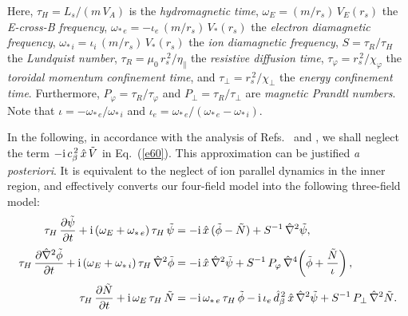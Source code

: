\documentclass[12pt,prb,aps,notitlepage]{revtex4-1}
\begin{document}
Here, 
$\tau_H = L_s/(m\,V_A)$ 
is the  {\em hydromagnetic time}, 
$\omega_E =(m/r_s)\,V_E(r_s)$
  the 
 {\em E-cross-B frequency}, 
$\omega_{\ast\,e} = -\iota_e\,(m/r_s)\,V_\ast(r_s)$
the {\em electron diamagnetic  frequency},
$\omega_{\ast\,i} =\iota_i\,(m/r_s)\,V_\ast(r_s)$
 the  {\em ion diamagnetic frequency}, 
$S=\tau_R/\tau_H$
 the  {\em Lundquist number}, 
$\tau_R = \mu_0\,r_s^{\,2}/\eta_\parallel$
 the {\em resistive diffusion time}, 
$\tau_\varphi
= r_s^{\,2}/\chi_\varphi$
the  {\em toroidal momentum confinement time}, and 
$\tau_\perp = r_s^{\,2}/\chi_\perp$ the {\em energy confinement time}.
  Furthermore, $P_\varphi = \tau_R/\tau_\varphi$ and $P_\perp = \tau_R/\tau_\perp$ are {\em magnetic Prandtl numbers}.
  Note that $\iota=-\omega_{\ast\,e}/\omega_{\ast\,i}$ and $\iota_e=\omega_{\ast\,e}/(\omega_{\ast\,e}-\omega_{\ast\,i})$. 

In the following, in accordance with the analysis of Refs.~ and , we shall
neglect the term  $-{\rm i}\,c_\beta^{\,2}\,\hat{x}\,\tilde{V}$ in Eq.~(\ref{e60}). This approximation can be justified {\em a posteriori}. 
It is equivalent to  the neglect of ion parallel dynamics in the inner region, and  effectively converts our four-field model into the following three-field model:
\begin{align}\label{e64}
\tau_H\,\frac{\partial\tilde{\psi}}{\partial t}+{\rm i}\,(\omega_E +\omega_{\ast\,e})\,\tau_H\,\tilde{\psi} &= -{\rm i} \,\hat{x}\,(\tilde{\phi}-\tilde{N})+ S^{-1}\,\hat{\nabla}^2\tilde{\psi},\\[0.5ex]
\tau_H\,\frac{\partial\hat{\nabla}^2\tilde{\phi}}{\partial t}+{\rm i}\,(\omega_E+\omega_{\ast\,i})\,\tau_H\,\hat{\nabla}^2\tilde{\phi} &= -{\rm i}\,\hat{x}\,\hat{\nabla}^2\tilde{\psi}+S^{-1}\,P_\varphi\,\hat{\nabla}^4\!\left(\tilde{\phi} + \frac{\tilde{N}}{\iota}\right),\\[0.5ex]
\tau_H\,\frac{\partial\tilde{N}}{\partial t}+{\rm i}\,\omega_E\,\tau_H\,\tilde{N} &= -{\rm i}\,\omega_{\ast\,e}\,\tau_H\,\tilde{\phi} - {\rm i}\,\iota_e\,\hat{d}_\beta^{\,2}\,\hat{x}\,\hat{\nabla}^2\tilde{\psi}+ S^{-1}\,P_\perp\,\hat{\nabla}^2 \tilde{N}.\label{e66}
\end{align}
\end{document}
